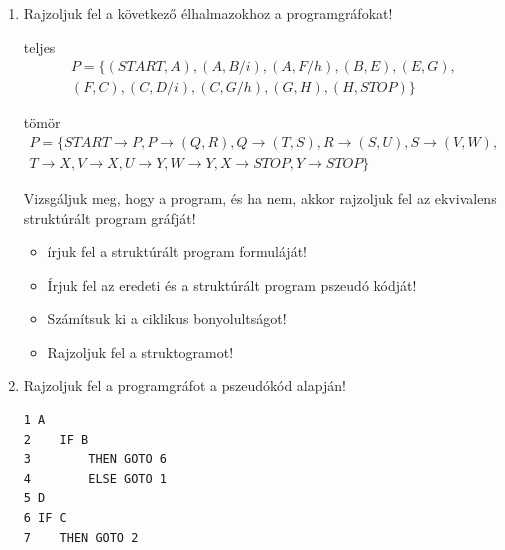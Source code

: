 \documentclass[a4paper]{article}
\begin{document}
\begin{enumerate}

\item

Rajzoljuk fel a következő élhalmazokhoz a programgráfokat!

teljes
\begin{gather*}
P = \{
(START, A),
(A, B/i), (A, F/h),
(B, E), (E, G), \\
(F, C), (C, D/i), (C, G/h),
(G, H), (H, STOP)
\}
\end{gather*}

tömör
\begin{gather*}
P = \{
START \rightarrow P,
P \rightarrow (Q, R),
Q \rightarrow (T, S),
R \rightarrow (S, U),
S \rightarrow (V, W), \\
T \rightarrow X,
V \rightarrow X,
U \rightarrow Y,
W \rightarrow Y,
X \rightarrow STOP,
Y \rightarrow STOP\}
\end{gather*}

Vizsgáljuk meg, hogy a program, és ha nem, akkor rajzoljuk fel az ekvivalens struktúrált program gráfját!

\begin{itemize}
	\item írjuk fel a struktúrált program formuláját!
	\item Írjuk fel az eredeti és a struktúrált program pszeudó kódját!
	\item Számítsuk ki a ciklikus bonyolultságot!
	\item Rajzoljuk fel a struktogramot!
\end{itemize}

\item

Rajzoljuk fel a programgráfot a pszeudókód alapján!

\begin{verbatim}
1 A
2    IF B
3        THEN GOTO 6
4        ELSE GOTO 1
5 D
6 IF C
7    THEN GOTO 2
\end{verbatim}

\end{enumerate}
\end{document}
